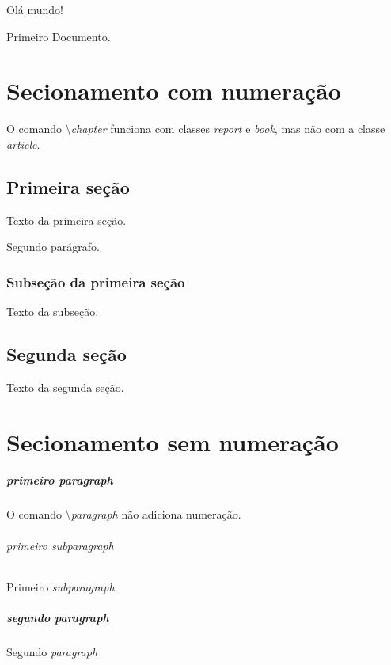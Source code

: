 \documentclass[a4paper,12pt]{report}
\begin{document}
	Olá mundo!
	
	Primeiro Documento.
	
	
	\chapter{Secionamento com numeração}
	
	O comando \textbackslash \emph{chapter} funciona com classes \emph{report} e \emph{book}, mas não com a classe \emph{article}.
	
	\section{Primeira seção}
	
	Texto da primeira seção.
	
	Segundo parágrafo.
	
	\subsection{Subseção da primeira seção}
	
	Texto da subseção.
	
	\section{Segunda seção}
	
	Texto da segunda seção.
	
	\chapter{Secionamento sem numeração}
	
	\paragraph{primeiro paragraph}
	
	O comando \textbackslash \emph{paragraph} não adiciona numeração.
	
	\subparagraph{primeiro subparagraph}
	
	Primeiro \emph{subparagraph}.
	
	\paragraph{segundo paragraph}
	
	Segundo \emph{paragraph}
		
\end{document}
